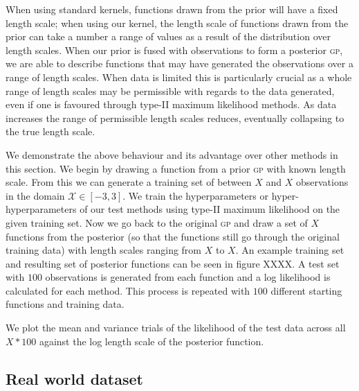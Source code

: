 \documentclass{article}
\begin{document}
When using standard kernels, functions drawn from the prior will have a fixed length scale; when using our kernel, the length scale of functions drawn from the prior can take a number a range of values as a result of the distribution over length scales. When our prior is fused with observations to form a posterior {\scshape gp}, we are able to describe functions that may have generated the observations over a range of length scales. When data is limited this is particularly crucial as a whole range of length scales may be permissible with regards to the data generated, even if one is favoured through type-II maximum likelihood methods. As data increases the range of permissible length scales reduces, eventually collapsing to the true length scale.

We demonstrate the above behaviour and its advantage over other methods in this section. We begin by drawing a function from a prior {\scshape gp} with known length scale. From this we can generate a training set of between $X$ and $X$ observations in the domain $\mathcal{X}\in [-3,3]$. We train the hyperparameters or hyper-hyperparameters of our test methods using type-II maximum likelihood on the given training set. Now we go back to the original {\scshape gp} and draw a set of $X$ functions from the posterior (so that the functions still go through the original training data) with length scales ranging from $X$ to $X$. An example training set and resulting set of posterior functions can be seen in figure XXXX. A test set with $100$ observations is generated from each function and a log likelihood is calculated for each method. This process is repeated with $100$ different starting functions and training data.

We plot the mean and variance trials of the likelihood of the test data across all $X*100$ against the log length scale of the posterior function.




\subsection{Real world dataset}










\end{document}
